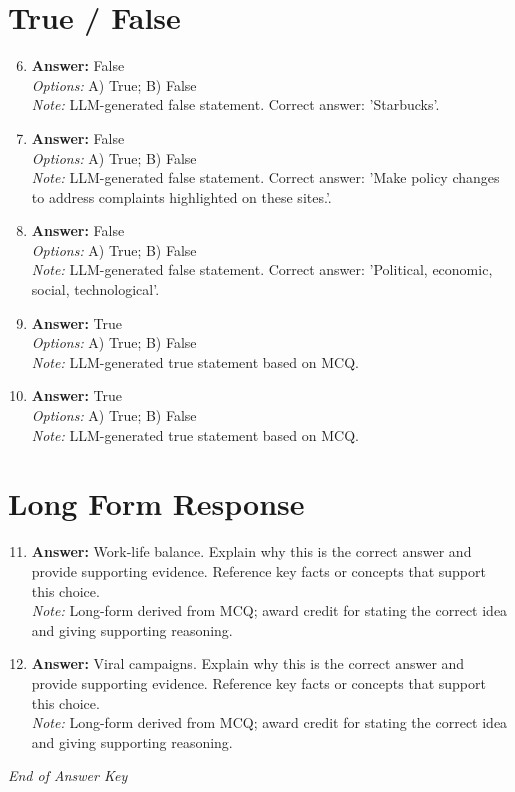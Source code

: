 \documentclass[12pt]{article}
\begin{document}
\section*{True / False}
\begin{enumerate}[label=\arabic*.]
\setcounter{enumi}{5}
\item \textbf{Answer:} False
\\ \textit{Options:} A) True; B) False
\\ \textit{Note:} LLM-generated false statement. Correct answer: 'Starbucks'.
\item \textbf{Answer:} False
\\ \textit{Options:} A) True; B) False
\\ \textit{Note:} LLM-generated false statement. Correct answer: 'Make policy changes to address complaints highlighted on these sites.'.
\item \textbf{Answer:} False
\\ \textit{Options:} A) True; B) False
\\ \textit{Note:} LLM-generated false statement. Correct answer: 'Political, economic, social, technological'.
\item \textbf{Answer:} True
\\ \textit{Options:} A) True; B) False
\\ \textit{Note:} LLM-generated true statement based on MCQ.
\item \textbf{Answer:} True
\\ \textit{Options:} A) True; B) False
\\ \textit{Note:} LLM-generated true statement based on MCQ.
\end{enumerate}

\section*{Long Form Response}
\begin{enumerate}[label=\arabic*.]
\setcounter{enumi}{10}
\item \textbf{Answer:} Work-life balance. Explain why this is the correct answer and provide supporting evidence. Reference key facts or concepts that support this choice.
\\ \textit{Note:} Long-form derived from MCQ; award credit for stating the correct idea and giving supporting reasoning.
\item \textbf{Answer:} Viral campaigns. Explain why this is the correct answer and provide supporting evidence. Reference key facts or concepts that support this choice.
\\ \textit{Note:} Long-form derived from MCQ; award credit for stating the correct idea and giving supporting reasoning.
\end{enumerate}

\vfill
\noindent\textit{End of Answer Key}
\end{document}
